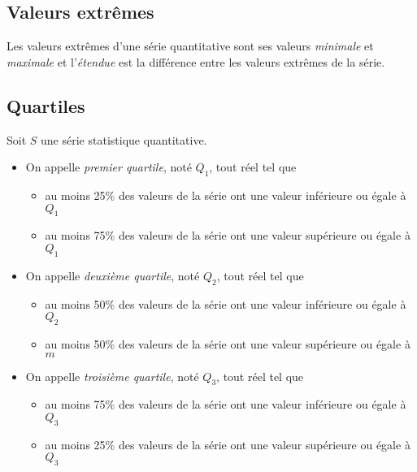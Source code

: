 \subsection{Valeurs extr\^emes}

\begin{definition}
Les valeurs extr\^emes d'une s\'erie quantitative sont ses valeurs \emph{minimale} et \emph{maximale} et l'\emph{\'etendue} est la diff\'erence entre les valeurs extr\^emes de la s\'erie.
\end{definition}

\subsection{Quartiles}

\begin{definition*}
Soit $S$ une s\'erie statistique quantitative.

\begin{itemize}
	\item On appelle \emph{premier quartile}, not\'e $Q_1$, tout r\'eel tel que
			\begin{itemize}
				\item au moins 25\% des valeurs de la s\'erie ont une valeur inf\'erieure ou \'egale \`a $Q_1$
			\item
			au moins 75\% des valeurs de la s\'erie ont une valeur sup\'erieure ou \'egale \`a $Q_1$
			\end{itemize}
	\item On appelle \emph{deuxi\`eme quartile}, not\'e $Q_2$, tout r\'eel tel que
			\begin{itemize}
				\item au moins 50\% des valeurs de la s\'erie ont une valeur inf\'erieure ou \'egale \`a $Q_2$
			\item
			au moins 50\% des valeurs de la s\'erie ont une valeur sup\'erieure ou \'egale \`a $m$
			\end{itemize}
		\item On appelle \emph{troisi\`eme quartile}, not\'e $Q_3$, tout r\'eel tel que
			\begin{itemize}
				\item au moins 75\% des valeurs de la s\'erie ont une valeur inf\'erieure ou \'egale \`a $Q_3$
			\item
			au moins 25\% des valeurs de la s\'erie ont une valeur sup\'erieure ou \'egale \`a $Q_3$
			\end{itemize}
      
	
\end{itemize}
\end{definition*}


